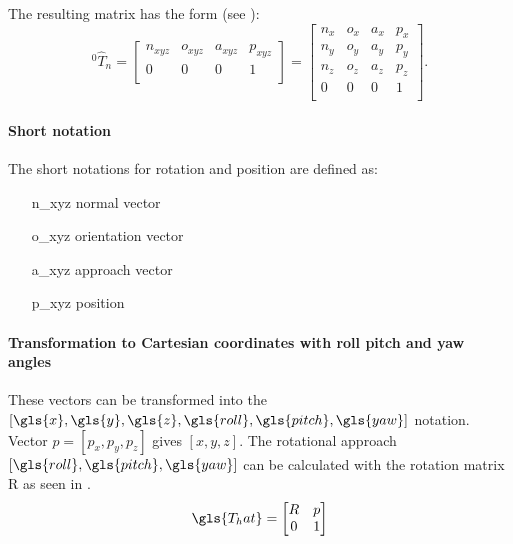 The resulting matrix has the form (see \cite{invKinSolYanWu}):
\begin{equation}\label{eq:matrixForm}
^0\hat{T}_n=
\begin{bmatrix}
n_{xyz} & o_{xyz} & a_{xyz} & p_{xyz} \\
0 & 0 & 0 & 1 \\
\end{bmatrix}
=
\begin{bmatrix}
n_x & o_x & a_x & p_x \\
n_y & o_y & a_y & p_y \\ %
n_z & o_z & a_z & p_z \\
0 & 0 & 0 & 1 \\
\end{bmatrix}.
\end{equation}

\paragraph{Short notation}
The short notations for rotation and position are defined as:

\begin{itemize}
	\item[\gls{n_xyz}] normal vector
	\item[\gls{o_xyz}] orientation vector
	\item[\gls{a_xyz}] approach vector
	\item[\gls{p_xyz}] position
\end{itemize}


\paragraph{Transformation to Cartesian coordinates with roll pitch and yaw angles }
These vectors can be transformed into the $[\gls{x},\gls{y},\gls{z},\gls{roll},\gls{pitch},\gls{yaw}]$ notation.
Vector $p = [p_x, p_y, p_z] $ gives $[x,y,z]$.
The rotational approach $[\gls{roll},\gls{pitch},\gls{yaw}]$ can be calculated with the rotation matrix \gls{R} as seen in \cite{ConstantinForwardKA}.
\begin{equation}\label{eq:rotMatrix_composition}
\gls{T_hat} = 
\begin{bmatrix}
R & p \\
0 & 1 \\
\end{bmatrix}
\end{equation}

